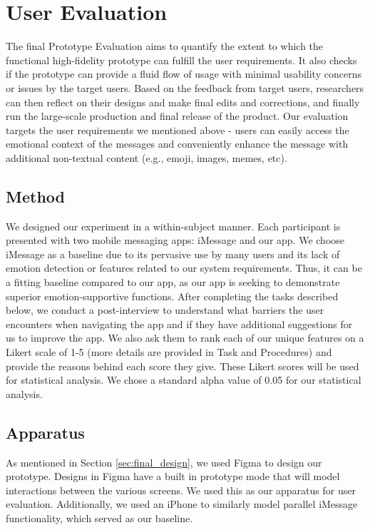 \documentclass[acmsmall,screen,authorversion,nonacm]{acmart}
\begin{document}
\section{User Evaluation}
The final Prototype Evaluation aims to quantify the extent to which the functional high-fidelity prototype can fulfill the user requirements. It also checks if the prototype can provide a fluid flow of usage with minimal usability concerns or issues by the target users. Based on the feedback from target users, researchers can then reflect on their designs and make final edits and corrections, and finally run the large-scale production and final release of the product. Our evaluation targets the user requirements we mentioned above - users can easily access the emotional context of the messages and conveniently enhance the message with additional non-textual content (e.g., emoji, images, memes, etc). 


\subsection{Method}
We designed our experiment in a within-subject manner. Each participant is presented with two mobile messaging apps: iMessage and our app. We choose iMessage as a baseline due to its pervasive use by many users and its lack of emotion detection or features related to our system requirements. Thus, it can be a fitting baseline compared to our app, as our app is seeking to demonstrate superior emotion-supportive functions. After completing the tasks described below, we conduct a post-interview to understand what barriers the user encounters when navigating the app and if they have additional suggestions for us to improve the app. We also ask them to rank each of our unique features on a Likert scale of 1-5 (more details are provided in Task and Procedures) and provide the reasons behind each score they give. These Likert scores will be used for statistical analysis. We chose a standard alpha value of 0.05 for our statistical analysis.


\subsection{Apparatus}

As mentioned in Section \ref{sec:final_design}, we used Figma to design our prototype. Designs in Figma have a built in prototype mode that will model interactions between the various screens. We used this as our apparatus for user evaluation. Additionally, we used an iPhone to similarly model parallel iMessage functionality, which served as our baseline.
\end{document}
